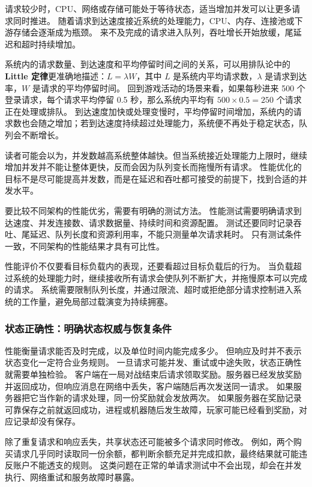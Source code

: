 请求较少时，CPU、网络或存储可能处于等待状态，适当增加并发可以让更多请求同时推进。
随着请求到达速度接近系统的处理能力，CPU、内存、连接池或下游存储会逐渐成为瓶颈。
来不及完成的请求进入队列，吞吐增长开始放缓，尾延迟和超时持续增加。

系统内的请求数量、到达速度和平均停留时间之间的关系，可以用排队论中的 \textbf{Little 定律}更准确地描述：$L=\lambda W$，其中 $L$ 是系统内平均请求数，$\lambda$ 是请求到达率，$W$ 是请求的平均停留时间。
回到游戏活动的场景来看，如果每秒进来 500 个登录请求，每个请求平均停留 0.5 秒，那么系统内平均有 $500\times 0.5=250$ 个请求正在处理或排队。
到达速度加快或处理变慢时，平均停留时间增加，系统内的请求数也会随之增加；若到达速度持续超过处理能力，系统便不再处于稳定状态，队列会不断增长。

读者可能会以为，并发数越高系统整体越快。但当系统接近处理能力上限时，继续增加并发并不能让整体更快，反而会因为队列变长而拖慢所有请求。
性能优化的目标不是尽可能提高并发数，而是在延迟和吞吐都可接受的前提下，找到合适的并发水平。

要比较不同架构的性能优劣，需要有明确的测试方法。
性能测试需要明确请求到达速度、并发连接数、请求数据量、持续时间和资源配置。
测试还要同时记录吞吐、尾延迟、队列长度和资源利用率，不能只测量单次请求耗时。
只有测试条件一致，不同架构的性能结果才具有可比性。

性能评价不仅要看目标负载内的表现，还要看超过目标负载后的行为。
当负载超过系统的处理能力时，继续接收所有请求会使队列不断扩大，并拖慢原本可以完成的请求。
系统需要限制队列长度，并通过限流、超时或拒绝部分请求控制进入系统的工作量，避免局部过载演变为持续拥塞。

\subsubsection{状态正确性：明确状态权威与恢复条件}\label{sec1:correctness-goal}

性能衡量请求能否及时完成，以及单位时间内能完成多少。
但响应及时并不表示状态变化一定符合业务规则。
一旦请求可能并发、重试或中途失败，状态正确性就需要单独检验。
客户端在一局对战结束后请求领取奖励。服务器已经发放奖励并返回成功，但响应消息在网络中丢失，客户端随后再次发送同一请求。
如果服务器把它当作新的请求处理，同一份奖励就会发放两次。
如果服务器在奖励记录可靠保存之前就返回成功，进程或机器随后发生故障，玩家可能已经看到奖励，对应记录却没有保存。

除了重复请求和响应丢失，共享状态还可能被多个请求同时修改。
例如，两个购买请求几乎同时读取同一份余额，都判断余额充足并完成扣款，最终结果就可能违反账户不能透支的规则。
这类问题在正常的单请求测试中不会出现，却会在并发执行、网络重试和服务故障时暴露。

